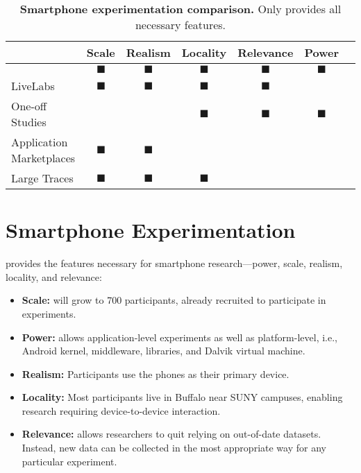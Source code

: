 \begin{table*}[t]
\begin{tabularx}{\textwidth}{Xcccccc}
& {\normalsize{\textbf{Scale}}} &
{\normalsize{\textbf{Realism}}} &
{\normalsize{\textbf{Locality}}} &
{\normalsize{\textbf{Relevance}}} &
{\normalsize{\textbf{Power}}} \\
\toprule

{\large \PhoneLab{}}
& $\blacksquare$ & $\blacksquare$ & $\blacksquare$ & $\blacksquare$ & $\blacksquare$ \\
\toprule

LiveLabs &
$\blacksquare$ & $\blacksquare$ & $\blacksquare$ & $\blacksquare$ & & \\
\midrule

One-off Studies &
& & $\blacksquare$ & $\blacksquare$ & $\blacksquare$ \\
\midrule

Application Marketplaces &
$\blacksquare$ & $\blacksquare$ & & & \\
\midrule

Large Traces &
$\blacksquare$ & $\blacksquare$ & $\blacksquare$ & & \\

\end{tabularx}
\caption{\textbf{Smartphone experimentation comparison.} Only \PhoneLab{}
provides all necessary features.}
\label{tab:comparison}
\end{table*}

\section{Smartphone Experimentation}
\label{sec-comparison}

\PhoneLab{} provides the features necessary for smartphone research---power,
scale, realism, locality, and relevance:

\begin{itemize}[nosep,leftmargin=*]
\vspace*{0.08in}
\item {\bf Scale:} \PhoneLab{} will grow to 700 participants, already
recruited to participate in experiments.
\item {\bf Power:} \PhoneLab{} allows application-level experiments as well
as platform-level, i.e., Android kernel, middleware, libraries, and Dalvik
virtual machine.
\item {\bf Realism:} Participants use the phones as their primary device.
\item {\bf Locality:} Most participants live in Buffalo near SUNY campuses,
enabling research requiring device-to-device interaction.
\item {\bf Relevance:} \PhoneLab{} allows researchers to quit relying on
out-of-date datasets. Instead, new data can be collected in the most
appropriate way for any particular experiment.
\vspace*{0.08in}
\end{itemize}

